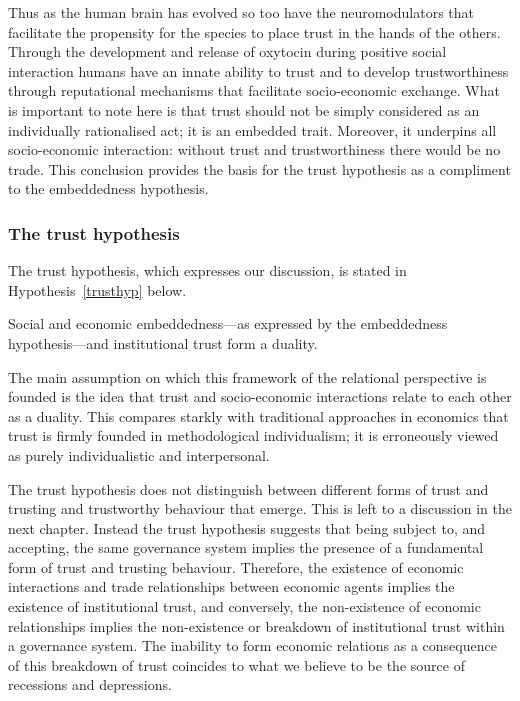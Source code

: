 \begin{subappendices}
Thus as the human brain has evolved so too have the neuromodulators that facilitate the propensity for the species to place trust in the hands of the others. Through the development and release of oxytocin during positive social interaction humans have an innate ability to trust and to develop trustworthiness through reputational mechanisms that facilitate socio-economic exchange. What is important to note here is that trust should not be simply considered as an individually rationalised act; it is an embedded trait. Moreover, it underpins all socio-economic interaction: without trust and trustworthiness there would be no trade. This conclusion provides the basis for the trust hypothesis as a compliment to the embeddedness hypothesis.

\subsubsection{The trust hypothesis}

The trust hypothesis, which expresses our discussion, is stated in Hypothesis~\ref{trusthyp} below.

\begin{hypothesis} \label{trusthyp}
Social and economic embeddedness---as expressed by the embeddedness hypothesis---and institutional trust form a duality.
\end{hypothesis}

The main assumption on which this framework of the relational perspective is founded is the idea that trust and socio-economic interactions relate to each other as a duality. This compares starkly with traditional approaches in economics that trust is firmly founded in methodological individualism; it is erroneously viewed as purely individualistic and interpersonal.

The trust hypothesis does not distinguish between different forms of trust and trusting and trustworthy behaviour that emerge. This is left to a discussion in the next chapter. Instead the trust hypothesis suggests that being subject to, and accepting, the same governance system implies the presence of a fundamental form of trust and trusting behaviour. Therefore, the existence of economic interactions and trade relationships between economic agents implies the existence of institutional trust, and conversely, the non-existence of economic relationships implies the non-existence or breakdown of institutional trust within a governance system. The inability to form economic relations as a consequence of this breakdown of trust coincides to what we believe to be the source of recessions and depressions.


\end{subappendices}

